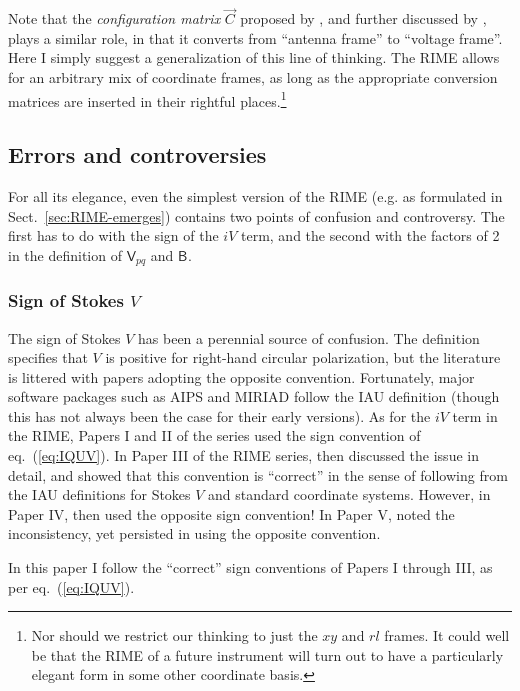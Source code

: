 \documentclass[]{aa}
\newcommand{\jones}[2]{\vec {#1}_{#2}}
\newcommand{\coh}[2]{\mathsf{{#1}}_{{#2}}}
\begin{document}
Note that the {\em configuration matrix} $\jones{C}{}$ proposed by \citet{ME1}, and further discussed by \citet{JEN:note185}, plays a similar role, in that it converts from ``antenna frame'' to ``voltage frame''. Here I simply suggest a generalization of this line of thinking. The RIME allows for an arbitrary mix of coordinate frames, as long as the appropriate conversion matrices are inserted in their rightful places.\footnote{Nor should we restrict our thinking to just the $xy$ and $rl$ frames. It could well be that the RIME of a future instrument will turn out to have a particularly elegant form in some other coordinate basis.}

\subsection{Errors and controversies\label{sec:controversies}}

For all its elegance, even the simplest version of the RIME (e.g. as formulated in Sect.~\ref{sec:RIME-emerges}) contains two points of confusion and controversy. The first has to do with the sign of the $iV$ term, and the second with the factors of 2 in the definition of $\coh{V}{pq}$ and $\coh{B}{}$.

\subsubsection{Sign of Stokes $V$}

The sign of Stokes $V$ has been a perennial source of confusion. The \citet{IAU74} definition specifies that $V$ is positive for right-hand circular polarization, but the literature is littered with papers adopting the opposite convention. Fortunately, major software packages such as AIPS and MIRIAD follow the IAU definition (though this 
has not always been the case for their early versions). As for the $iV$ term in the RIME, Papers I and II of the series \citep{ME1,ME2} used the sign convention of eq.~(\ref{eq:IQUV}). In Paper III of the RIME series, \citet{ME3} then discussed the issue in detail, and showed that this convention is ``correct'' in the sense of following from the IAU definitions for Stokes $V$ and standard coordinate systems. However, in Paper IV, \citet{ME4} then used the opposite sign convention! In Paper V, \citet{ME5} noted the inconsistency, yet persisted in using the opposite convention. 

In this paper I follow the ``correct'' sign conventions of Papers I through III, as per eq.~(\ref{eq:IQUV}).
\end{document}
